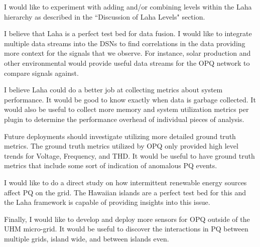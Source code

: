 I would like to experiment with adding and/or combining levels within the Laha hierarchy as described in the ``Discussion of Laha Levels" section.

I believe that Laha is a perfect test bed for data fusion. I would like to integrate multiple data streams into the DSNs to find correlations in the data providing more context for the signals that we observe. For instance, solar production and other environmental would provide useful data streams for the OPQ network to compare signals against.

I believe Laha could do a better job at collecting metrics about system performance. It would be good to know exactly when data is garbage collected. It would also be useful to collect more memory and system utilization metrics per plugin to determine the performance overhead of individual pieces of analysis.

Future deployments should investigate utilizing more detailed ground truth metrics. The ground truth metrics utilized by OPQ only provided high level trends for Voltage, Frequency, and THD. It would be useful to have ground truth metrics that include some sort of indication of anomalous PQ events.

I would like to do a direct study on how intermittent renewable energy sources affect PQ on the grid. The Hawaiian islands are a perfect test bed for this and the Laha framework is capable of providing insights into this issue.

Finally, I would like to develop and deploy more sensors for OPQ outside of the UHM micro-grid. It would be useful to discover the interactions in PQ between multiple grids, island wide, and between islands even.

